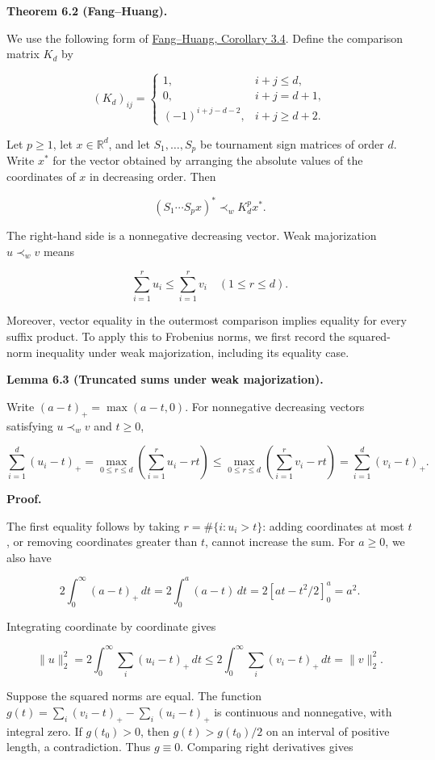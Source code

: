 \documentclass[11pt,a4paper]{article}
\begin{document}
\textbf{Theorem 6.2 (Fang--Huang).}

We use the following form of \href{https://arxiv.org/html/2608.06238v1\#S3}{Fang--Huang, Corollary 3.4}. Define the comparison matrix \(K_d\) by

\[
(K_d)_{ij}=\begin{cases}
1,&i+j\le d,\\
0,&i+j=d+1,\\
(-1)^{i+j-d-2},&i+j\ge d+2.
\end{cases}
\]

Let \(p\ge1\), let \(x\in\mathbb R^d\), and let \(S_1,\ldots,S_p\) be tournament sign matrices of order \(d\). Write \(x^*\) for the vector obtained by arranging the absolute values of the coordinates of \(x\) in decreasing order. Then

\[
(S_1\cdots S_p x)^*\prec_w K_d^p x^*.
\]

The right-hand side is a nonnegative decreasing vector. Weak majorization \(u\prec_w v\) means

\[
\sum_{i=1}^r u_i\le\sum_{i=1}^r v_i
\quad(1\le r\le d).
\]

Moreover, vector equality in the outermost comparison implies equality for every suffix product. To apply this to Frobenius norms, we first record the squared-norm inequality under weak majorization, including its equality case.

\textbf{Lemma 6.3 (Truncated sums under weak majorization).}

Write \((a-t)_+=\max(a-t,0)\). For nonnegative decreasing vectors satisfying \(u\prec_w v\) and \(t\ge0\),

\[
\sum_{i=1}^d(u_i-t)_+
=\max_{0\le r\le d}\left(\sum_{i=1}^r u_i-rt\right)
\le\max_{0\le r\le d}\left(\sum_{i=1}^r v_i-rt\right)
=\sum_{i=1}^d(v_i-t)_+.
\]

\textbf{Proof.}

The first equality follows by taking \(r=\#\{i:u_i>t\}\): adding coordinates at most \(t\), or removing coordinates greater than \(t\), cannot increase the sum. For \(a\ge0\), we also have

\[
2\int_0^\infty(a-t)_+\,dt
=2\int_0^a(a-t)\,dt
=2[at-t^2/2]_0^a=a^2.
\]

Integrating coordinate by coordinate gives

\[
\|u\|_2^2
=2\int_0^\infty\sum_i(u_i-t)_+\,dt
\le2\int_0^\infty\sum_i(v_i-t)_+\,dt
=\|v\|_2^2.
\]

Suppose the squared norms are equal. The function \(g(t)=\sum_i(v_i-t)_+-\sum_i(u_i-t)_+\) is continuous and nonnegative, with integral zero. If \(g(t_0)>0\), then \(g(t)>g(t_0)/2\) on an interval of positive length, a contradiction. Thus \(g\equiv0\). Comparing right derivatives gives
\end{document}
